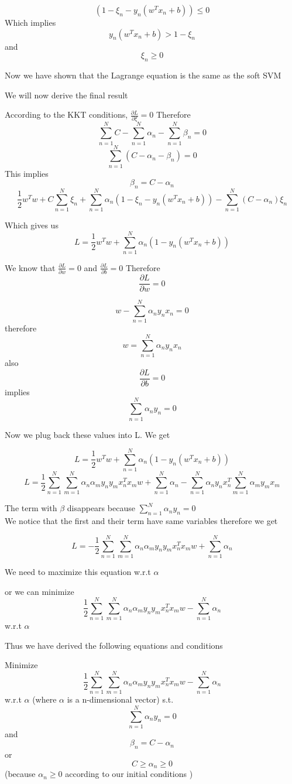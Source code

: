 \documentclass{article}
\begin{document}
$$(1 - \xi_n -y_n(w^Tx_n+b)) \le 0$$
Which implies 
$$y_n(w^Tx_n+b)>1- \xi_n  $$
and 
$$\xi_n \ge 0 $$

Now we have shown that the Lagrange equation is the same as the soft SVM

We will now derive the final result

According to the KKT conditions, $\frac{\partial L}{\partial \xi} = 0$ 
Therefore 
$$ \sum_{n = 1}^{N}C-\sum_{n=1}^{N}\alpha_n - \sum_{n = 1}^{N}\beta_n = 0$$
$$ \sum_{n = 1}^{N}(C-\alpha_n -\beta_n) = 0 $$
This implies 
$$\beta_n = C - \alpha_n$$
$$\frac{1}{2}w^Tw+ C\sum_{n = 1}^{N}\xi_n+\sum_{n=1}^{N}\alpha_n(1 - \xi_n -y_n(w^Tx_n+b)) - \sum_{n = 1}^{N}(C - \alpha_n)\xi_n$$

Which gives us 
$$L = \frac{1}{2}w^Tw+\sum_{n=1}^{N}\alpha_n(1 -y_n(w^Tx_n+b)) $$

We know that $\frac{\partial L}{\partial w} = 0 $ and $\frac{\partial L}{\partial b} = 0 $
Therefore 
$$\frac{\partial L}{\partial w} = 0 $$

$$ w-\sum_{n=1}^{N}\alpha_ny_nx_n = 0 $$
therefore
$$w =\sum_{n=1}^{N}\alpha_ny_nx_n  $$
also 
$$\frac{\partial L}{\partial b} = 0 $$
implies 
$$ \sum_{n=1}^{N}\alpha_ny_n = 0  $$

Now we plug back these values into L. We get 

$$L = \frac{1}{2}w^Tw+\sum_{n=1}^{N}\alpha_n(1 -y_n(w^Tx_n+b)) $$
$$L = \frac{1}{2}\sum_{n = 1 }^{N}\sum_{m = 1 }^{N}\alpha_n\alpha_my_ny_mx_n^Tx_m w+\sum_{n=1}^{N}\alpha_n - \sum_{n=1}^{N}\alpha_ny_nx_n^T\sum_{m = 1 }^{N}\alpha_my_mx_m$$ 

The term with $\beta$  disappears because $ \sum_{n=1}^{N}\alpha_ny_n = 0  $
\\
We notice that the first and their term have same variables therefore we get 

$$L = -\frac{1}{2}\sum_{n = 1 }^{N}\sum_{m = 1 }^{N}\alpha_n\alpha_my_ny_mx_n^Tx_m w+\sum_{n=1}^{N}\alpha_n $$

We need to maximize this equation w.r.t $\alpha$

or we can minimize 
$$\frac{1}{2}\sum_{n = 1 }^{N}\sum_{m = 1 }^{N}\alpha_n\alpha_my_ny_mx_n^Tx_m w - \sum_{n=1}^{N}\alpha_n$$
w.r.t $\alpha$

Thus we have derived the following equations and conditions 

Minimize 
$$
\frac{1}{2}\sum_{n = 1 }^{N}\sum_{m = 1 }^{N}\alpha_n\alpha_my_ny_mx_n^Tx_m w - \sum_{n=1}^{N}\alpha_n
$$
w.r.t $\alpha$ (where $\alpha$ is a n-dimensional vector) 
s.t. 
$$ \sum_{n=1}^{N}\alpha_ny_n = 0  $$
and 
$$\beta_n = C - \alpha_n$$
or 
$$C \ge \alpha_n  \ge 0$$ 
(because $\alpha_n \ge 0$ according to our initial conditions )
\end{document}
